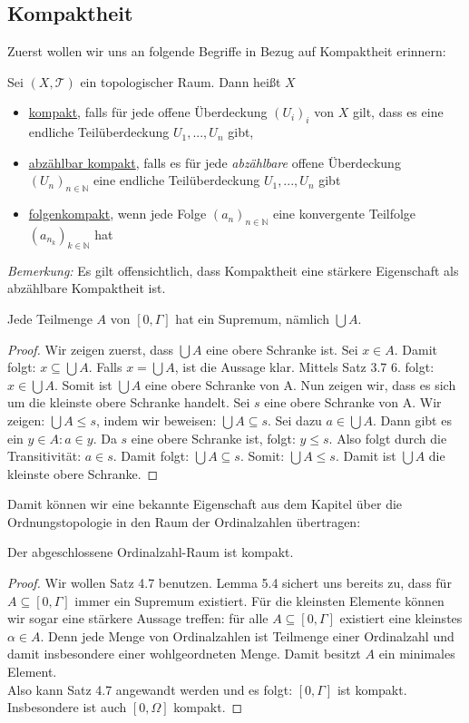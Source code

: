 \documentclass[11pt]{scrartcl}
\begin{document}
\subsection{Kompaktheit}
Zuerst wollen wir uns an folgende Begriffe in Bezug auf Kompaktheit erinnern:
\begin{definition}
	Sei $(X,\mathcal T)$ ein topologischer Raum. Dann heißt $X$
	\begin{itemize}
		\item \underline{kompakt}, falls für jede offene Überdeckung $(U_i)_{i}$ von $X$
			gilt, dass es eine endliche Teilüberdeckung $U_1,...,U_n$ gibt,
		\item \underline{abzählbar kompakt}, falls es für jede \textit{abzählbare} offene 
			Überdeckung $(U_n)_{n\in\mathbb N}$ eine endliche Teilüberdeckung $U_1,...,U_n$
			gibt
		\item \underline{folgenkompakt}, wenn jede Folge $(a_n)_{n\in\mathbb N}$ eine konvergente
			Teilfolge $(a_{n_k})_{k\in\mathbb N}$ hat
	\end{itemize}
\end{definition}
\noindent \textit{Bemerkung:} Es gilt offensichtlich, dass Kompaktheit eine stärkere Eigenschaft als abzählbare Kompaktheit ist.
\begin{lemma}
	Jede Teilmenge $A$ von $[0,\Gamma]$ hat ein Supremum, nämlich $\bigcup A$.
\end{lemma}
\begin{proof}
	Wir zeigen zuerst, dass $\bigcup A$ eine obere Schranke ist.
	Sei $x\in A$. Damit folgt: $ x \subseteq \bigcup A$. Falls $x=\bigcup A$, ist die Aussage klar. Mittels Satz 3.7 6. folgt: $x\in \bigcup A$. Somit ist $\bigcup A$ eine obere Schranke von A.
	Nun zeigen wir, dass es sich um die kleinste obere Schranke handelt. Sei $s$ eine obere Schranke von A.
	Wir zeigen: $\bigcup A\leq s$, indem wir beweisen: $\bigcup A \subseteq s$. Sei dazu $a\in \bigcup A$. 
	Dann gibt es ein $y\in A: a\in y$. Da $s$ eine obere Schranke ist, folgt: $y \leq s$. Also folgt durch
	die Transitivität: $a\in s$. Damit folgt: $\bigcup A \subseteq s$. Somit: $\bigcup A \leq s$.
	Damit ist $\bigcup A$ die kleinste obere Schranke.
\end{proof}
Damit können wir eine bekannte Eigenschaft aus dem Kapitel über die Ordnungstopologie in den Raum der Ordinalzahlen übertragen:
\begin{theorem}
	Der abgeschlossene Ordinalzahl-Raum ist kompakt.
\end{theorem}
\begin{proof}
	Wir wollen Satz 4.7 benutzen. Lemma 5.4 sichert uns bereits zu, dass für $A\subseteq [0,\Gamma]$ immer ein Supremum existiert. Für die kleinsten Elemente können wir sogar eine stärkere Aussage treffen:
für alle $A\subseteq [0,\Gamma]$ existiert eine kleinstes $\alpha \in A$. Denn jede Menge von
Ordinalzahlen ist Teilmenge einer Ordinalzahl und damit insbesondere einer wohlgeordneten Menge. Damit besitzt $A$ ein minimales Element.\\
Also kann Satz 4.7 angewandt werden und es folgt: $[0,\Gamma]$ ist kompakt. Insbesondere ist auch $[0,\Omega]$ kompakt.
\end{proof}
\end{document}
